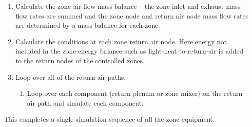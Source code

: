 \begin{enumerate}
\begin{enumerate}
    \end{enumerate}
  \item
    Calculate the zone air flow mass balance -- the zone inlet and exhaust mass flow rates are summed and the zone node and return air node mass flow rates are determined by a mass balance for each zone.
  \item
    Calculate the conditions at each zone return air node. Here energy not included in the zone energy balance such as light-heat-to-return-air is added to the return nodes of the controlled zones.
  \item
    Loop over all of the return air paths.
    \begin{enumerate}
      \item
        Loop over each component (return plenum or zone mixer) on the return air path and simulate each component.
    \end{enumerate}
\end{enumerate}

This completes a single simulation sequence of all the zone equipment.
